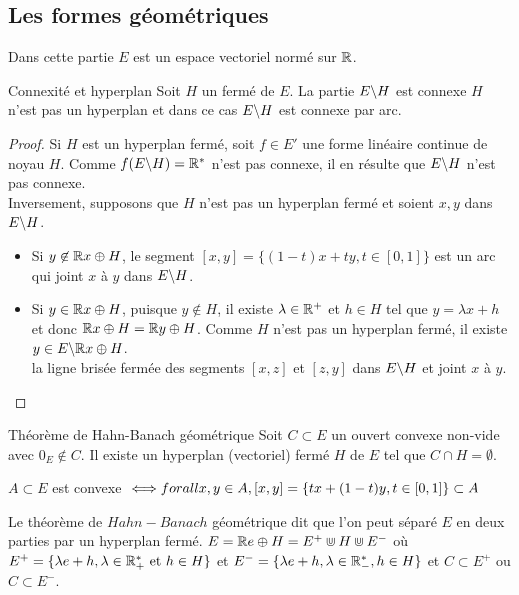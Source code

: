 \documentclass[]{report}
\begin{document}
    \subsection*{Les formes géométriques}
    
    Dans cette partie $E$ est un espace vectoriel normé sur $\mathbb{R}$.

    \begin{lm}{Connexité et hyperplan}{}
        Soit $H$ un \sev fermé de $E$. La partie $E\backslash H$ est connexe \ssi $H$ n'est pas un hyperplan et dans ce cas $E\backslash H$ est connexe par arc.
    \end{lm}

    \begin{proof}
        Si $H$ est un hyperplan fermé, soit $f\in E'$ une forme linéaire continue de noyau $H$. Comme $f(E\backslash H)=\mathbb{R}^*$ n'est pas connexe, il en résulte que $E\backslash H$ n'est pas connexe.\\
        Inversement, supposons que $H$ n'est pas un hyperplan fermé et soient $x,y$ dans $E\backslash H$.
        \begin{itemize}
            \item Si $y\not\in \mathbb{R} x\oplus H$, le segment $[x,y]=\{(1-t)x+ty,t\in [0,1]\}$ est un arc qui joint $x$ à $y$ dans $E\backslash H$.
            \item Si $y\in \mathbb{R} x\oplus H$, puisque $y\not \in H$, il existe $\lambda \in \mathbb{R}^+$ et $h\in H$ tel que $y=\lambda x+ h$ et donc $\mathbb{R} x\oplus H= \mathbb{R} y\oplus H$. Comme $H$ n'est pas un hyperplan fermé, il existe $y\in E\backslash \mathbb{R} x\oplus H$.\\
            la ligne brisée fermée des segments $[x,z]$ et $[z,y]$ dans $E\backslash H$ et joint $x$ à $y$.
        \end{itemize}
    \end{proof}

    \begin{tm}{Théorème de Hahn-Banach géométrique}{}
        Soit $C\subset E$ un ouvert convexe non-vide avec $0_E\not\in C$. Il existe un hyperplan (vectoriel) fermé $H$ de $E$ tel que $C\cap H=\emptyset$.
    \end{tm}

    \begin{ra}{}{}
        $A\subset E$ est convexe $\iff \\forall x,y\in A,[x,y]=\{tx+(1-t)y,t\in [0,1]\}\subset A$
    \end{ra}

    \begin{re}{}{}
        Le théorème de $Hahn-Banach$ géométrique dit que l'on peut séparé $E$ en deux parties par un hyperplan fermé. $E=\mathbb{R} e \oplus H=E^+\Cup H\Cup E^-$ où $E^+=\{\lambda e+h,\lambda\in \mathbb{R}_+^*\text{ et }h\in H\}$ et $E^-=\{\lambda e+h,\lambda\in \mathbb{R}_-^*,h\in H\}$ et $C\subset E^+$ ou $C\subset E^-$.
    \end{re}
\end{document}
